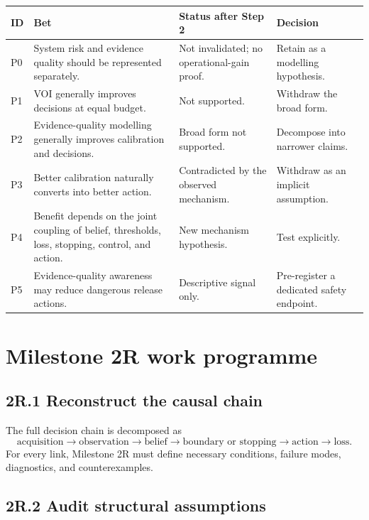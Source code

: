 \documentclass[11pt,a4paper]{article}
\begin{document}
\begin{longtable}{p{}p{}p{}p{}}
\toprule
ID & Bet & Status after Step 2 & Decision \\
\midrule
P0 & System risk and evidence quality should be represented separately. & Not invalidated; no operational-gain proof. & Retain as a modelling hypothesis. \\
P1 & VOI generally improves decisions at equal budget. & Not supported. & Withdraw the broad form. \\
P2 & Evidence-quality modelling generally improves calibration and decisions. & Broad form not supported. & Decompose into narrower claims. \\
P3 & Better calibration naturally converts into better action. & Contradicted by the observed mechanism. & Withdraw as an implicit assumption. \\
P4 & Benefit depends on the joint coupling of belief, thresholds, loss, stopping, control, and action. & New mechanism hypothesis. & Test explicitly. \\
P5 & Evidence-quality awareness may reduce dangerous release actions. & Descriptive signal only. & Pre-register a dedicated safety endpoint. \\
\bottomrule
\end{longtable}

\section{Milestone 2R work programme}

\subsection{2R.1 Reconstruct the causal chain}

The full decision chain is decomposed as
\[
\text{acquisition}\rightarrow\text{observation}\rightarrow\text{belief}
\rightarrow\text{boundary or stopping}\rightarrow\text{action}\rightarrow\text{loss}.
\]
For every link, Milestone 2R must define necessary conditions, failure modes, diagnostics, and counterexamples.

\subsection{2R.2 Audit structural assumptions}
\end{document}
